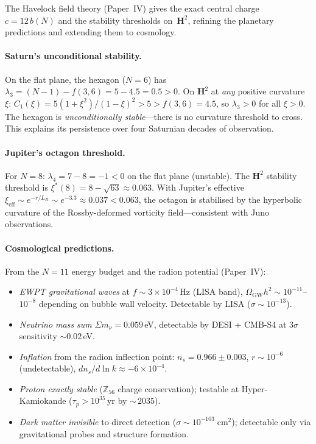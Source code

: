 The Havelock field theory (Paper~IV) gives the exact central
charge $c = 12\,b(N)$ and the stability thresholds on~$\mathbf{H}^2$,
refining the planetary predictions and extending them to cosmology.

\paragraph{Saturn's unconditional stability.}
On the flat plane, the hexagon ($N = 6$) has
$\lambda_3 = (N{-}1) - f(3,6) = 5 - 4.5 = 0.5 > 0$.
On $\mathbf{H}^2$ at \emph{any} positive curvature~$\xi$:
$C_1(\xi) = 5(1{+}\xi^2)/(1{-}\xi)^2 > 5 > f(3,6) = 4.5$,
so $\lambda_3 > 0$ for all $\xi > 0$.
The hexagon is \emph{unconditionally stable}---there is no
curvature threshold to cross.
This explains its persistence over four Saturnian decades of observation.

\paragraph{Jupiter's octagon threshold.}
For $N = 8$: $\lambda_4 = 7 - 8 = -1 < 0$ on the flat plane (unstable).
The $\mathbf{H}^2$ stability threshold is
$\xi^*(8) = 8 - \sqrt{63} \approx 0.063$.
With Jupiter's effective $\xi_{\mathrm{eff}} \sim e^{-r/L_R}
\sim e^{-3.3} \approx 0.037 < 0.063$,
the octagon is stabilised by the hyperbolic curvature of the
Rossby-deformed vorticity field---consistent with Juno observations.

\paragraph{Cosmological predictions.}
From the $N = 11$ energy budget and the radion potential (Paper~IV):
\begin{itemize}
\item \emph{EWPT gravitational waves} at $f \sim 3 \times 10^{-4}$\,Hz
  (LISA band), $\Omega_{\mathrm{GW}} h^2 \sim 10^{-11}$--$10^{-8}$
  depending on bubble wall velocity.
  Detectable by LISA ($\sigma \sim 10^{-13}$).
\item \emph{Neutrino mass sum} $\Sigma m_\nu = 0.059$\,eV,
  detectable by DESI $+$ CMB-S4 at $3\sigma$ sensitivity $\sim 0.02$\,eV.
\item \emph{Inflation} from the radion inflection point:
  $n_s = 0.966 \pm 0.003$, $r \sim 10^{-6}$ (undetectable),
  $dn_s/d\ln k \approx -6 \times 10^{-4}$.
\item \emph{Proton exactly stable} ($\mathbb{Z}_{56}$ charge conservation);
  testable at Hyper-Kamiokande ($\tau_p > 10^{35}$\,yr by ${\sim}\,2035$).
\item \emph{Dark matter invisible} to direct detection
  ($\sigma \sim 10^{-103}\;\mathrm{cm}^2$);
  detectable only via gravitational probes and structure formation.
\end{itemize}

